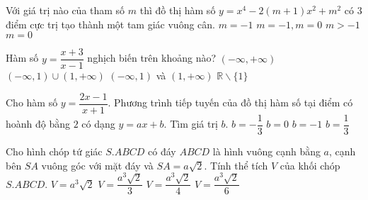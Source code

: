 \begin{ex}%
Với giá trị nào của tham số $m$ thì đồ thị hàm số $y=x^4-2(m+1)x^2+m^2$ có $3$ điểm cực trị tạo thành một tam giác vuông cân.
\choice
{$m=-1$}
{$m=-1, m=0$}
{$m>-1$}
{\True $m=0$}
\end{ex}

\begin{ex}%
Hàm số $y=\dfrac{x+3}{x-1}$ nghịch biến trên khoảng nào?
\choice
{$(- \infty,+ \infty)$}
{$(-\infty,1) \cup (1,+\infty)$}
{\True $(-\infty,1)$ và $(1,+\infty)$}
{$\mathbb{R} \backslash \{1\}$}
\end{ex}

\begin{ex}%
Cho hàm số $y=\dfrac{2x-1}{x+1}$. Phương trình tiếp tuyến của đồ thị hàm số tại điểm có hoành độ bằng $2$ có dạng $y=ax+b$. Tìm giá trị $b$.
\choice
{$b=-\dfrac{1}{3}$}
{$b=0$}
{$b=-1$}
{\True $b=\dfrac{1}{3}$}
\end{ex}

\begin{ex}%
Cho hình chóp tứ giác $S.ABCD$ có đáy $ABCD$ là hình vuông cạnh bằng $a$, cạnh bên $SA$ vuông góc với mặt đáy và $SA=a \sqrt{2}$. Tính thể tích $V$ của khối chóp $S.ABCD$.
\choice
{$V=a^3 \sqrt{2}$}
{\True $V=\dfrac{a^3\sqrt{2}}{3}$}
{$V=\dfrac{a^3\sqrt{2}}{4}$}
{$V=\dfrac{a^3\sqrt{2}}{6}$}
\end{ex}

